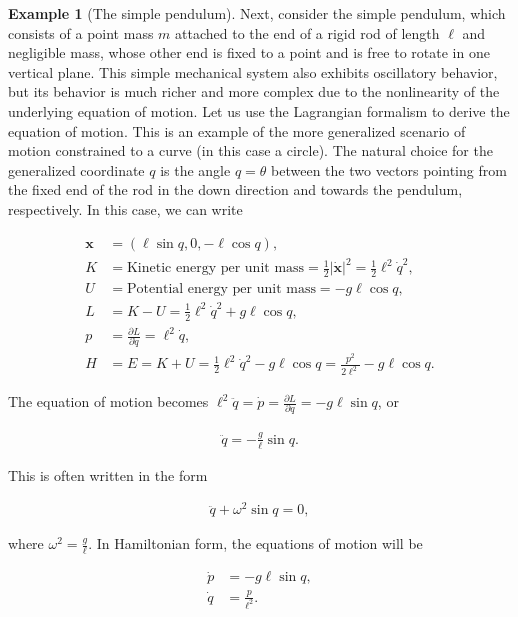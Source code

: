 \documentclass[11pt]{report}
\theoremstyle{plain}
\theoremstyle{definition}
\newtheorem{example}[thm]{Example}
\begin{document}
\begin{example}[The simple pendulum]
Next, consider the simple pendulum, which consists of
a point mass $m$ attached to the end of a rigid rod of
length $\ell$ and negligible mass, whose other end is
fixed to a point and is free to rotate in one vertical
plane. This simple mechanical system also exhibits
oscillatory behavior, but its behavior is much richer
and more complex due to the nonlinearity of the
underlying equation of motion. Let us use the
Lagrangian formalism to derive the equation of motion.
This is an example of the more generalized scenario of
motion constrained to a curve (in this case a circle).
The natural choice for the generalized coordinate $q$
is the angle $q=\theta$ between the two vectors
pointing from the fixed end of the rod in the down
direction and towards the pendulum, respectively. In
this case, we can write

\begin{align*}
\mathbf{x} &= (\ell\sin q, 0, -\ell \cos q), \\
K &= \textrm{Kinetic energy per unit mass} = \tfrac12|\dot{\mathbf{x}}|^2 = \tfrac12 \ell^2 \dot{q}^2, \\
U &= \textrm{Potential energy per unit mass} = -g\ell\cos q, \\
L &= K-U = \tfrac12 \ell^2 \dot{q}^2 + g \ell \cos q, \\
p &= \frac{\partial L}{\partial \dot{q}} = \ell^2 \dot{q}, \\
H &= E = K+U = \tfrac12 \ell^2 \dot{q}^2 - g \ell\cos q
= \frac{p^2}{2\ell^2} - g\ell\cos q.
\end{align*}

\noindent The equation of motion becomes
$\ell^2 \ddot{q}=\dot{p} = \frac{\partial L}{\partial
q}=-g\ell \sin q$,
or

\begin{align*}
\ddot{q} = -\frac{g}{\ell} \sin q.
\end{align*}

\noindent This is often written in the form

\begin{equation*} \tag{12}\label{eq:pendulumeq}
\begin{split}
\ddot{q} + \omega^2 \sin q = 0,
\end{split}
\end{equation*}

\noindent where $\omega^2 = \frac{g}{\ell}$. In Hamiltonian
form, the equations of motion will be

\begin{align*}
\dot{p}&= -g\ell \sin q, \\ \dot{q}&=\frac{p}{\ell^2}.
\end{align*}

\end{example}
\end{document}
